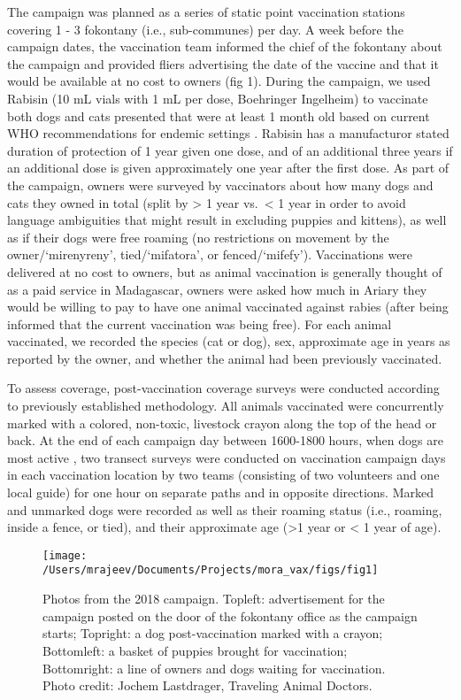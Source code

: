 \documentclass[tropicalmed,article,submit,moreauthors,pdftex]{mdpi}
\begin{document}
The campaign was planned as a series of static point vaccination
stations covering 1 - 3 fokontany (i.e., sub-communes) per day. A week
before the campaign dates, the vaccination team informed the chief of
the fokontany about the campaign and provided fliers advertising the
date of the vaccine and that it would be available at no cost to owners
(fig 1). During the campaign, we used Rabisin (10 mL vials with 1 mL per
dose, Boehringer Ingelheim) to vaccinate both dogs and cats presented
that were at least 1 month old based on current WHO recommendations for
endemic settings \citep{morters2015, world2018expert}. Rabisin has a
manufacturor stated duration of protection of 1 year given one dose, and
of an additional three years if an additional dose is given
approximately one year after the first dose. As part of the campaign,
owners were surveyed by vaccinators about how many dogs and cats they
owned in total (split by \textgreater{} 1 year vs.~\textless{} 1 year in
order to avoid language ambiguities that might result in excluding
puppies and kittens), as well as if their dogs were free roaming (no
restrictions on movement by the owner/`mirenyreny', tied/`mifatora', or
fenced/`mifefy'). Vaccinations were delivered at no cost to owners, but
as animal vaccination is generally thought of as a paid service in
Madagascar, owners were asked how much in Ariary they would be willing
to pay to have one animal vaccinated against rabies (after being
informed that the current vaccination was being free). For each animal
vaccinated, we recorded the species (cat or dog), sex, approximate age
in years as reported by the owner, and whether the animal had been
previously vaccinated.

To assess coverage, post-vaccination coverage surveys were conducted
according to previously established
methodology\citep{sambo2017, gibson2015}. All animals vaccinated were
concurrently marked with a colored, non-toxic, livestock crayon along
the top of the head or back. At the end of each campaign day between
1600-1800 hours, when dogs are most active \citep{sambo2017}, two
transect surveys were conducted on vaccination campaign days in each
vaccination location by two teams (consisting of two volunteers and one
local guide) for one hour on separate paths and in opposite directions.
Marked and unmarked dogs were recorded as well as their roaming status
(i.e., roaming, inside a fence, or tied), and their approximate age
(\textgreater1 year or \textless{} 1 year of age).

\begin{figure}
\texttt{[image: /Users/mrajeev/Documents/Projects/mora\_vax/figs/fig1]} \caption{Photos from the 2018 campaign. Topleft: advertisement for the campaign posted on the door of the fokontany office as the campaign starts; Topright: a dog post-vaccination marked with a crayon; Bottomleft: a basket of puppies brought for vaccination; Bottomright: a line of owners and dogs waiting for vaccination. Photo credit: Jochem Lastdrager, Traveling Animal Doctors.}\label{fig:fig1}
\end{figure}
\end{document}
